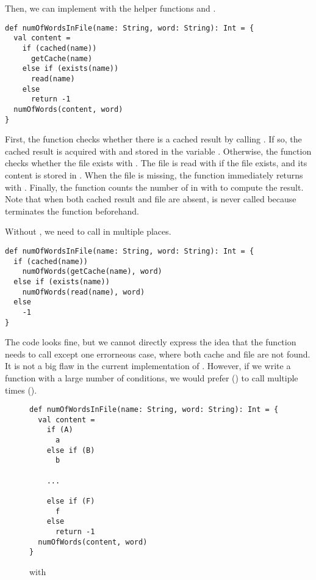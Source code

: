 Then, we can implement  with the helper functions and
.

\begin{verbatim}
def numOfWordsInFile(name: String, word: String): Int = {
  val content =
    if (cached(name))
      getCache(name)
    else if (exists(name))
      read(name)
    else
      return -1
  numOfWords(content, word)
}
\end{verbatim}

First, the function checks whether there is a cached result by calling .
If so, the cached result is acquired with  and stored in the variable
. Otherwise, the function checks whether the file exists with
. The file is read with  if the file exists, and its
content is stored in . When the file is missing, the function
immediately returns  with . Finally, the function
counts the number of  in  with  to
compute the result. Note that when both cached result and file are absent,
 is never called because  terminates the
function beforehand.

Without , we need to call  in multiple places.

\begin{verbatim}
def numOfWordsInFile(name: String, word: String): Int = {
  if (cached(name))
    numOfWords(getCache(name), word)
  else if (exists(name))
    numOfWords(read(name), word)
  else
    -1
}
\end{verbatim}

The code looks fine, but we cannot directly express the idea that the function needs to
call  except one errorneous case, where both cache and file are
not found. It is not a big flaw in the current implementation of
.
However, if we write a function with a large number of conditions, we would
prefer  () to call  multiple
times ().

\begin{figure}[t]
\begin{verbatim}
def numOfWordsInFile(name: String, word: String): Int = {
  val content =
    if (A)
      a
    else if (B)
      b

    ...

    else if (F)
      f
    else
      return -1
  numOfWords(content, word)
}
\end{verbatim}
\caption{ with }
\end{figure}

